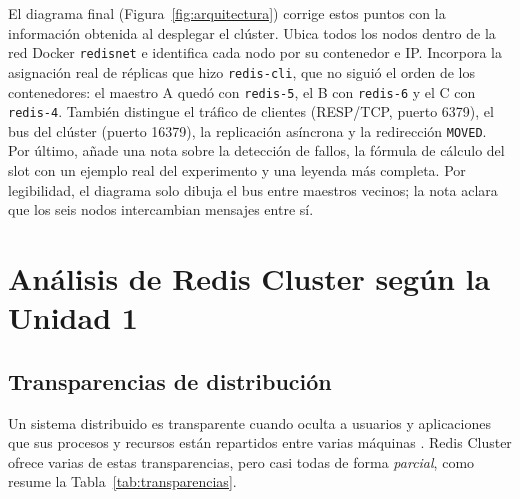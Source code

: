 \documentclass[11pt,a4paper]{article}
\begin{document}
El diagrama final (Figura~\ref{fig:arquitectura}) corrige estos puntos con la
información obtenida al desplegar el clúster. Ubica todos los nodos dentro de
la red Docker \texttt{redisnet} e identifica cada nodo por su contenedor e IP.
Incorpora la asignación real de réplicas que hizo \texttt{redis-cli}, que no
siguió el orden de los contenedores: el maestro A quedó con
\texttt{redis-5}, el B con \texttt{redis-6} y el C con \texttt{redis-4}.
También distingue el tráfico de clientes (RESP/TCP, puerto 6379), el bus del
clúster (puerto 16379), la replicación asíncrona y la redirección
\texttt{MOVED}. Por último, añade una nota sobre la detección de fallos, la
fórmula de cálculo del slot con un ejemplo real del experimento y una leyenda
más completa. Por legibilidad, el diagrama solo dibuja el bus entre maestros
vecinos; la nota aclara que los seis nodos intercambian mensajes entre sí.

\section{Análisis de Redis Cluster según la Unidad 1}
\label{sec:unidad1}

\subsection{Transparencias de distribución}

Un sistema distribuido es transparente cuando oculta a usuarios y
aplicaciones que sus procesos y recursos están repartidos entre varias
máquinas \cite{vansteen2023distributed}. Redis Cluster ofrece varias de estas
transparencias, pero casi todas de forma \emph{parcial}, como resume la
Tabla~\ref{tab:transparencias}.
\end{document}
